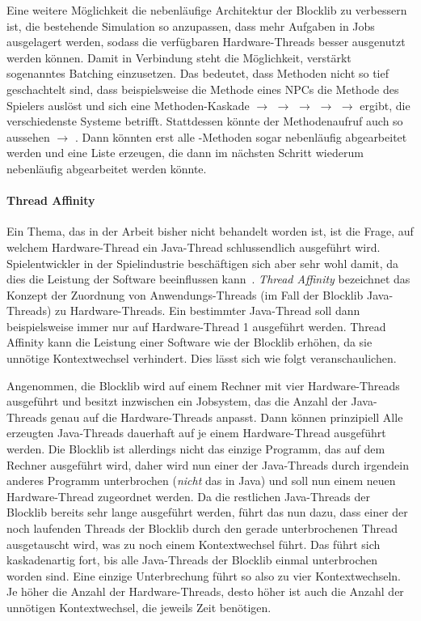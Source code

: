\documentclass[12pt,a4paper,listof=toc,parskip=half,numbers=noenddot,abstract=true]{scrartcl}
\begin{document}
Eine weitere Möglichkeit die nebenläufige Architektur der Blocklib zu verbessern ist, die bestehende Simulation so anzupassen, dass mehr Aufgaben in Jobs ausgelagert werden, sodass die verfügbaren Hardware-Threads besser ausgenutzt werden können. Damit in Verbindung steht die Möglichkeit, verstärkt sogenanntes Batching einzusetzen. Das bedeutet, dass Methoden nicht so tief geschachtelt sind, dass beispielsweise die  Methode eines NPCs die  Methode des Spielers auslöst und sich eine Methoden-Kaskade  $\to$  $\to$  $\to$  $\to$  $\to$  ergibt, die verschiedenste Systeme betrifft. Stattdessen könnte der Methodenaufruf auch so aussehen  $\to$ . Dann könnten erst alle 
-Methoden sogar nebenläufig abgearbeitet werden und eine Liste erzeugen, die dann im nächsten Schritt wiederum nebenläufig abgearbeitet werden könnte. 

\paragraph{Thread Affinity}
Ein Thema, das in der Arbeit bisher nicht behandelt worden ist, ist die Frage, auf welchem Hardware-Thread ein Java-Thread schlussendlich ausgeführt wird. Spielentwickler in der Spielindustrie beschäftigen sich aber sehr wohl damit, da dies die Leistung der Software beeinflussen kann~\cite{Gyrling2015}. \emph{Thread Affinity} bezeichnet das Konzept der Zuordnung von Anwendungs-Threads (im Fall der Blocklib Java-Threads) zu Hardware-Threads. Ein bestimmter Java-Thread soll dann beispielsweise immer nur auf Hardware-Thread 1 ausgeführt werden. Thread Affinity kann die Leistung einer Software wie der Blocklib erhöhen, da sie unnötige Kontextwechsel verhindert. Dies lässt sich wie folgt veranschaulichen.

Angenommen, die Blocklib wird auf einem Rechner mit vier Hardware-Threads ausgeführt und besitzt inzwischen ein Jobsystem, das die Anzahl der Java-Threads genau auf die Hardware-Threads anpasst. Dann können prinzipiell Alle erzeugten Java-Threads dauerhaft auf je einem Hardware-Thread ausgeführt werden. Die Blocklib ist allerdings nicht das einzige Programm, das auf dem Rechner ausgeführt wird, daher wird nun einer der Java-Threads durch irgendein anderes Programm unterbrochen (\emph{nicht} das  in Java) und soll nun einem neuen Hardware-Thread zugeordnet werden. Da die restlichen Java-Threads der Blocklib bereits sehr lange ausgeführt werden, führt das nun dazu, dass einer der noch laufenden Threads der Blocklib durch den gerade unterbrochenen Thread ausgetauscht wird, was zu noch einem Kontextwechsel führt. Das führt sich kaskadenartig fort, bis alle Java-Threads der Blocklib einmal unterbrochen worden sind. Eine einzige Unterbrechung führt so also zu vier Kontextwechseln. Je höher die Anzahl der Hardware-Threads, desto höher ist auch die Anzahl der unnötigen Kontextwechsel, die jeweils Zeit benötigen.
\end{document}
